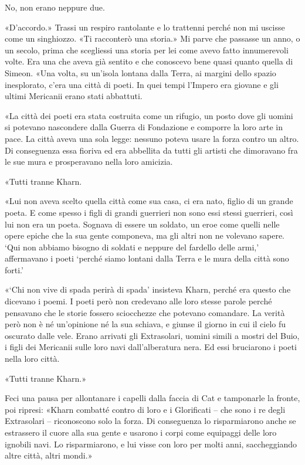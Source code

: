 No, non erano neppure due.

«D'accordo.» Trassi un respiro rantolante e lo trattenni perché non mi
uscisse come un singhiozzo. «Ti racconterò una storia.» Mi parve che
passasse un anno, o un secolo, prima che scegliessi una storia per lei
come avevo fatto innumerevoli volte. Era una che aveva già sentito e che
conoscevo bene quasi quanto quella di Simeon. «Una volta, su un'isola
lontana dalla Terra, ai margini dello spazio inesplorato, c'era una
città di poeti. In quei tempi l'Impero era giovane e gli ultimi
Mericanii erano stati abbattuti.

«La città dei poeti era stata costruita come un rifugio, un posto dove
gli uomini si potevano nascondere dalla Guerra di Fondazione e comporre
la loro arte in pace. La città aveva una sola legge: nessuno poteva
usare la forza contro un altro. Di conseguenza essa fioriva ed era
abbellita da tutti gli artisti che dimoravano fra le sue mura e
prosperavano nella loro amicizia.

«Tutti tranne Kharn.

«Lui non aveva scelto quella città come sua casa, ci era nato, figlio di
un grande poeta. E come spesso i figli di grandi guerrieri non sono essi
stessi guerrieri, così lui non era un poeta. Sognava di essere un
soldato, un eroe come quelli nelle opere epiche che la sua gente
componeva, ma gli altri non ne volevano sapere. `Qui non abbiamo bisogno
di soldati e neppure del fardello delle armi,' affermavano i poeti
`perché siamo lontani dalla Terra e le mura della città sono forti.'

«`Chi non vive di spada perirà di spada' insisteva Kharn, perché era
questo che dicevano i poemi. I poeti però non credevano alle loro stesse
parole perché pensavano che le storie fossero sciocchezze che potevano
comandare. La verità però non è né un'opinione né la sua schiava, e
giunse il giorno in cui il cielo fu oscurato dalle vele. Erano arrivati
gli Extrasolari, uomini simili a mostri del Buio, i figli dei Mericanii
sulle loro navi dall'alberatura nera. Ed essi bruciarono i poeti nella
loro città.

«Tutti tranne Kharn.»

Feci una pausa per allontanare i capelli dalla faccia di Cat e
tamponarle la fronte, poi ripresi: «Kharn combatté contro di loro e i
Glorificati -- che sono i re degli Extrasolari -- riconoscono solo la
forza. Di conseguenza lo risparmiarono anche se estrassero il cuore alla
sua gente e usarono i corpi come equipaggi delle loro ignobili navi. Lo
risparmiarono, e lui visse con loro per molti anni, saccheggiando altre
città, altri mondi.»

